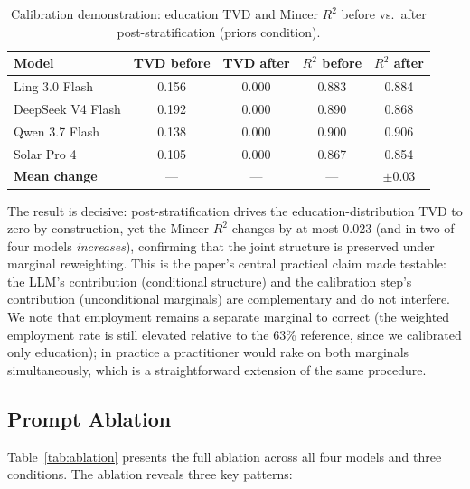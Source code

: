 \documentclass[11pt]{article}
\begin{document}
\begin{table}[htbp]
\centering
\caption{Calibration demonstration: education TVD and Mincer $R^2$ before vs.\ after post-stratification (priors condition).}
\label{tab:calibration}
\small
\begin{tabular}{lcccc}
\toprule
\textbf{Model} & \textbf{TVD before} & \textbf{TVD after} & \textbf{$R^2$ before} & \textbf{$R^2$ after} \\
\midrule
Ling 3.0 Flash    & 0.156 & 0.000 & 0.883 & 0.884 \\
DeepSeek V4 Flash & 0.192 & 0.000 & 0.890 & 0.868 \\
Qwen 3.7 Flash    & 0.138 & 0.000 & 0.900 & 0.906 \\
Solar Pro 4       & 0.105 & 0.000 & 0.867 & 0.854 \\
\midrule
\textbf{Mean change} & --- & --- & --- & $\pm 0.03$ \\
\bottomrule
\end{tabular}
\end{table}

The result is decisive: post-stratification drives the education-distribution TVD to zero by construction, yet the Mincer $R^2$ changes by at most 0.023 (and in two of four models \emph{increases}), confirming that the joint structure is preserved under marginal reweighting.
This is the paper's central practical claim made testable: the LLM's contribution (conditional structure) and the calibration step's contribution (unconditional marginals) are complementary and do not interfere.
We note that employment remains a separate marginal to correct (the weighted employment rate is still elevated relative to the 63\% reference, since we calibrated only education); in practice a practitioner would rake on both marginals simultaneously, which is a straightforward extension of the same procedure.

\subsection{Prompt Ablation}
\label{sec:results:ablation}

Table~\ref{tab:ablation} presents the full ablation across all four models and three conditions.
The ablation reveals three key patterns:
\end{document}
